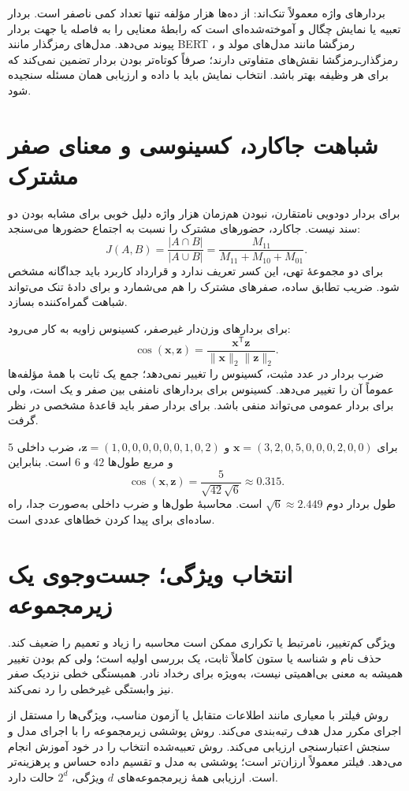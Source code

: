 \documentclass[12pt,a4paper,oneside]{report}
\newcounter{ex}[chapter]
\newenvironment{example}[1]{\refstepcounter{ex}\begin{tcolorbox}[breakable=false,title={مثال \thechapter.\arabic{ex} | #1},colframe=muted,colback=white]}{\end{tcolorbox}}
\begin{document}
بردارهای واژه معمولاً تنک‌اند: از ده‌ها هزار مؤلفه تنها تعداد کمی ناصفر است. بردار تعبیه یا  نمایش چگال و آموخته‌شده‌ای است که رابطهٔ معنایی را به فاصله یا جهت بردار پیوند می‌دهد. مدل‌های رمزگذار مانند BERT ، رمزگشا مانند مدل‌های مولد و رمزگذارـ‌رمزگشا نقش‌های متفاوتی دارند؛ صرفاً کوتاه‌تر بودن بردار تضمین نمی‌کند که برای هر وظیفه بهتر باشد. انتخاب نمایش باید با داده و ارزیابی همان مسئله سنجیده شود.

\section{شباهت جاکارد، کسینوسی و معنای صفر مشترک}
برای بردار دودویی نامتقارن، نبودن هم‌زمان هزار واژه دلیل خوبی برای مشابه بودن دو سند نیست. جاکارد، حضورهای مشترک را نسبت به اجتماع حضورها می‌سنجد:
\[J(A,B)=\frac{|A\cap B|}{|A\cup B|}=\frac{M_{11}}{M_{11}+M_{10}+M_{01}}.\]
برای دو مجموعهٔ تهی، این کسر تعریف ندارد و قرارداد کاربرد باید جداگانه مشخص شود. ضریب تطابق ساده، صفرهای مشترک را هم می‌شمارد و برای دادهٔ تنک می‌تواند شباهت گمراه‌کننده بسازد.

برای بردارهای وزن‌دار غیرصفر، کسینوس زاویه به کار می‌رود:
\[\operatorname{cos}(\mathbf x,\mathbf z)=\frac{\mathbf x^\mathsf T\mathbf z}{\|\mathbf x\|_2\|\mathbf z\|_2}.\]
ضرب بردار در عدد مثبت، کسینوس را تغییر نمی‌دهد؛ جمع یک ثابت با همهٔ مؤلفه‌ها عموماً آن را تغییر می‌دهد. کسینوس برای بردارهای نامنفی بین صفر و یک است، ولی برای بردار عمومی می‌تواند منفی باشد. برای بردار صفر باید قاعدهٔ مشخصی در نظر گرفت.

\begin{example}{کنترل محاسبهٔ کسینوس}
برای $\mathbf x=(3,2,0,5,0,0,0,2,0,0)$ و $\mathbf z=(1,0,0,0,0,0,0,1,0,2)$، ضرب داخلی $5$ و مربع طول‌ها $42$ و $6$ است. بنابراین
\[\operatorname{cos}(\mathbf x,\mathbf z)=\frac5{\sqrt{42}\sqrt6}\approx0.315.\]
طول بردار دوم $\sqrt6\approx2.449$ است. محاسبهٔ طول‌ها و ضرب داخلی به‌صورت جدا، راه ساده‌ای برای پیدا کردن خطاهای عددی است.
\end{example}

\section{انتخاب ویژگی؛ جست‌وجوی یک زیرمجموعه}
ویژگی کم‌تغییر، نامرتبط یا تکراری ممکن است محاسبه را زیاد و تعمیم را ضعیف کند. حذف نام و شناسه یا ستون کاملاً ثابت، یک بررسی اولیه است؛ ولی کم بودن تغییر همیشه به معنی بی‌اهمیتی نیست، به‌ویژه برای رخداد نادر. همبستگی خطی نزدیک صفر نیز وابستگی غیرخطی را رد نمی‌کند.

روش فیلتر  با معیاری مانند اطلاعات متقابل یا آزمون مناسب، ویژگی‌ها را مستقل از اجرای مکرر مدل هدف رتبه‌بندی می‌کند. روش پوششی  زیرمجموعه را با اجرای مدل و سنجش اعتبارسنجی ارزیابی می‌کند. روش تعبیه‌شده  انتخاب را در خود آموزش انجام می‌دهد. فیلتر معمولاً ارزان‌تر است؛ پوششی به مدل و تقسیم داده حساس و پرهزینه‌تر است. ارزیابی همهٔ زیرمجموعه‌های $d$ ویژگی، $2^d$ حالت دارد.
\end{document}

